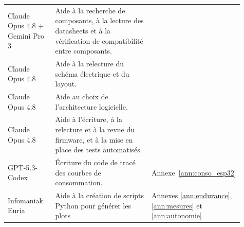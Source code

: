 \begin{table}[H]
\begin{tabular}{p{0.22\linewidth} p{0.56\linewidth} >{\centering\arraybackslash}p{0.13\linewidth}}
        Claude Opus 4.8 \newline + Gemini Pro 3     & Aide à la recherche de composants, à la lecture des datasheets et à la vérification de compatibilité entre composants.       & 4                                                                     \\
        Claude Opus 4.8                             & Aide à la relecture du schéma électrique et du layout.                                                                       & 4                                                                     \\
        Claude Opus 4.8                             & Aide au choix de l'architecture logicielle.                                                                                  & 5                                                                     \\
        Claude Opus 4.8                             & Aide à l'écriture, à la relecture et à la revue du firmware, et à la mise en place des tests automatisés.                    & 5                                                                     \\
        GPT-5.3-Codex                               & Écriture du code de tracé des courbes de consommation.                                                                       & Annexe~\ref{ann:conso_esp32}                                          \\
        Infomaniak Euria                            & Aide à la création de scripts Python pour générer les plots                                                                  & Annexes \ref{ann:endurance}, \ref{ann:mesures} et \ref{ann:autonomie} \\
        \hline
    \end{tabular}
\end{table}